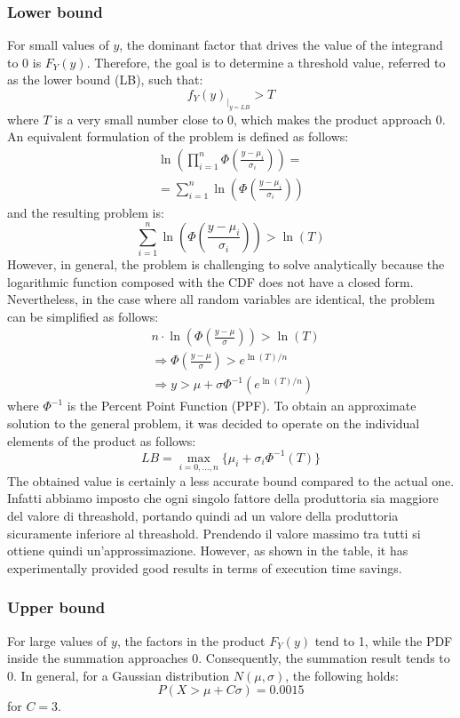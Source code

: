 \subsubsection{Lower bound}
For small values of \( y \), the dominant factor that drives the value of the integrand to 0 is \( F_Y(y) \). Therefore, the goal is to determine a threshold value, referred to as the lower bound (LB), such that:
$$f_Y(y)_{|_{y = LB}} > T $$
where \( T \) is a very small number close to 0, which makes the product approach 0. An equivalent formulation of the problem is defined as follows:
\begin{align*}
    \ln{\left(\prod_{i = 1}^n \Phi\left(\frac{y - \mu_i}{\sigma_i}\right)\right)} = \\
    = \sum_{i=1}^n  \ln{\left(\Phi\left(\frac{y - \mu_i}{\sigma_i}\right)\right)}
\end{align*}
and the resulting problem is:
$$ \sum_{i=1}^n  \ln{\left(\Phi\left(\frac{y - \mu_i}{\sigma_i}\right)\right)} > \ln(T) $$
However, in general, the problem is challenging to solve analytically because the logarithmic function composed with the CDF does not have a closed form. Nevertheless, in the case where all random variables are identical, the problem can be simplified as follows:
\begin{align*}
    &n \cdot \ln{\left(\Phi\left(\frac{y - \mu}{\sigma}\right)\right)} > \ln(T) \\
    & \Rightarrow \Phi\left(\frac{y - \mu}{\sigma}\right) > e^{\ln(T) / n} \\
    & \Rightarrow y > \mu + \sigma \Phi^{-1}\left(e^{\ln(T) / n}\right)
\end{align*}
where $\Phi^{-1}$ is the Percent Point Function (PPF). To obtain an approximate solution to the general problem, it was decided to operate on the individual elements of the product as follows:
$$LB = \max_{i=0,...,n}\{\mu_i + \sigma_i \Phi^{-1}(T)\}$$
The obtained value is certainly a less accurate bound compared to the actual one. Infatti abbiamo imposto che ogni singolo fattore della produttoria sia maggiore del valore di threashold, portando quindi ad un valore della produttoria sicuramente inferiore al threashold. Prendendo il valore massimo tra tutti si ottiene quindi un'approssimazione.
However, as shown in the table, it has experimentally provided good results in terms of execution time savings.

\subsubsection{Upper bound}
For large values of \( y \), the factors in the product \( F_Y(y) \) tend to 1, while the PDF inside the summation approaches 0. Consequently, the summation result tends to 0. In general, for a Gaussian distribution \( N(\mu, \sigma) \), the following holds:
$$P(X > \mu + C \sigma) = 0.0015$$
for \( C = 3 \).

